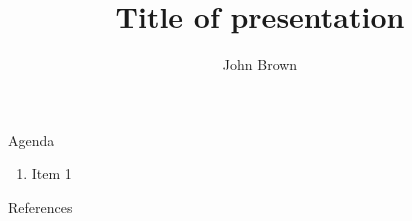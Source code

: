 \documentclass[xcolor=table]{beamer}
\title{Title of presentation}
\author[author1]{John Brown}
\institute{Faculty of Information and Communication Technology}
\begin{document}
	\frame{\titlepage}

	\begin{frame}{Agenda}
		\begin{enumerate}
			\item Item 1
		\end{enumerate}
	\end{frame}

	\begin{frame}{References}
		\printbibliography
	\end{frame}
\end{document}
